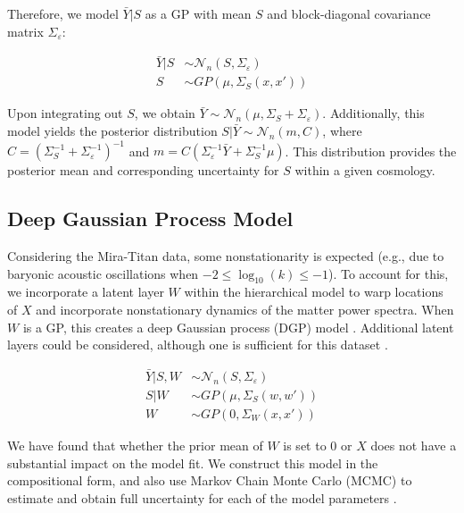\documentclass[11pt]{article}
\begin{document}
Therefore, we model $\bar Y|S$ as a GP with mean $S$ and block-diagonal covariance matrix $\Sigma_\varepsilon$:

\begin{align}
\bar Y|S &\sim \mathcal{N}_n(S,\Sigma_\varepsilon) \\
S &\sim GP\left(\mu, \Sigma_S(x,x')\right)
\end{align}

Upon integrating out $S$, we obtain $\bar Y \sim \mathcal{N}_n(\mu, \Sigma_S+\Sigma_\varepsilon)$. Additionally, this model yields the posterior distribution $S|\bar Y \sim \mathcal{N}_n(m, C)$, where $C=\left(\Sigma_S^{-1}+\Sigma_\varepsilon^{-1}\right)^{-1}$ and $m=C\left(\Sigma_\varepsilon^{-1}\bar Y+\Sigma_S^{-1}\mu\right)$. 
This distribution provides the posterior mean and corresponding uncertainty for $S$ within a given cosmology. 

\subsection{Deep Gaussian Process Model}

Considering the Mira-Titan data, some nonstationarity is expected (e.g., due to baryonic acoustic oscillations when $-2 \leq \log_{10}(k) \leq -1$). To account for this, we incorporate a latent layer $W$ within the hierarchical model to warp locations of $X$ and incorporate nonstationary dynamics of the matter power spectra. When $W$ is a GP, this creates a deep Gaussian process (DGP) model \citep{damianou2013deep}. Additional latent layers could be considered, although one is sufficient for this dataset \citep{dunlop2018deep}.

\begin{align}
\bar Y|S,W &\sim \mathcal{N}_n(S,\Sigma_\varepsilon) \\
S|W &\sim GP\left(\mu, \Sigma_S(w,w')\right) \\
W &\sim GP\left(0, \Sigma_W(x,x')\right)
\end{align}

We have found that whether the prior mean of $W$ is set to 0 or $X$ \citep[which would indicate stationarity apriori,][]{schmidt2003bayesian} does not have a substantial impact on the model fit. We construct this model in the compositional form, and also use Markov Chain Monte Carlo (MCMC) to estimate and obtain full uncertainty for each of the model parameters \citep{sauer2023active}.
\end{document}
